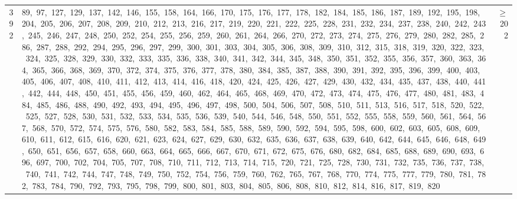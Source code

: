 \begin{longtable}{c|p{}|r}
392 & 89,\ 97,\ 127,\ 129,\ 137,\ 142,\ 146,\ 155,\ 158,\ 164,\ 166,\ 170,\ 175,\ 176,\ 177,\ 178,\ 182,\ 184,\ 185,\ 186,\ 187,\ 189,\ 192,\ 195,\ 198,\ 204,\ 205,\ 206,\ 207,\ 208,\ 209,\ 210,\ 212,\ 213,\ 216,\ 217,\ 219,\ 220,\ 221,\ 222,\ 225,\ 228,\ 231,\ 232,\ 234,\ 237,\ 238,\ 240,\ 242,\ 243,\ 245,\ 246,\ 247,\ 248,\ 250,\ 252,\ 254,\ 255,\ 256,\ 259,\ 260,\ 261,\ 264,\ 266,\ 270,\ 272,\ 273,\ 274,\ 275,\ 276,\ 279,\ 280,\ 282,\ 285,\ 286,\ 287,\ 288,\ 292,\ 294,\ 295,\ 296,\ 297,\ 299,\ 300,\ 301,\ 303,\ 304,\ 305,\ 306,\ 308,\ 309,\ 310,\ 312,\ 315,\ 318,\ 319,\ 320,\ 322,\ 323,\ 324,\ 325,\ 328,\ 329,\ 330,\ 332,\ 333,\ 335,\ 336,\ 338,\ 340,\ 341,\ 342,\ 344,\ 345,\ 348,\ 350,\ 351,\ 352,\ 355,\ 356,\ 357,\ 360,\ 363,\ 364,\ 365,\ 366,\ 368,\ 369,\ 370,\ 372,\ 374,\ 375,\ 376,\ 377,\ 378,\ 380,\ 384,\ 385,\ 387,\ 388,\ 390,\ 391,\ 392,\ 395,\ 396,\ 399,\ 400,\ 403,\ 405,\ 406,\ 407,\ 408,\ 410,\ 411,\ 412,\ 413,\ 414,\ 416,\ 418,\ 420,\ 424,\ 425,\ 426,\ 427,\ 429,\ 430,\ 432,\ 434,\ 435,\ 437,\ 438,\ 440,\ 441,\ 442,\ 444,\ 448,\ 450,\ 451,\ 455,\ 456,\ 459,\ 460,\ 462,\ 464,\ 465,\ 468,\ 469,\ 470,\ 472,\ 473,\ 474,\ 475,\ 476,\ 477,\ 480,\ 481,\ 483,\ 484,\ 485,\ 486,\ 488,\ 490,\ 492,\ 493,\ 494,\ 495,\ 496,\ 497,\ 498,\ 500,\ 504,\ 506,\ 507,\ 508,\ 510,\ 511,\ 513,\ 516,\ 517,\ 518,\ 520,\ 522,\ 525,\ 527,\ 528,\ 530,\ 531,\ 532,\ 533,\ 534,\ 535,\ 536,\ 539,\ 540,\ 544,\ 546,\ 548,\ 550,\ 551,\ 552,\ 555,\ 558,\ 559,\ 560,\ 561,\ 564,\ 567,\ 568,\ 570,\ 572,\ 574,\ 575,\ 576,\ 580,\ 582,\ 583,\ 584,\ 585,\ 588,\ 589,\ 590,\ 592,\ 594,\ 595,\ 598,\ 600,\ 602,\ 603,\ 605,\ 608,\ 609,\ 610,\ 611,\ 612,\ 615,\ 616,\ 620,\ 621,\ 623,\ 624,\ 627,\ 629,\ 630,\ 632,\ 635,\ 636,\ 637,\ 638,\ 639,\ 640,\ 642,\ 644,\ 645,\ 646,\ 648,\ 649,\ 650,\ 651,\ 656,\ 657,\ 658,\ 660,\ 663,\ 664,\ 665,\ 666,\ 667,\ 670,\ 671,\ 672,\ 675,\ 676,\ 680,\ 682,\ 684,\ 685,\ 688,\ 689,\ 690,\ 693,\ 696,\ 697,\ 700,\ 702,\ 704,\ 705,\ 707,\ 708,\ 710,\ 711,\ 712,\ 713,\ 714,\ 715,\ 720,\ 721,\ 725,\ 728,\ 730,\ 731,\ 732,\ 735,\ 736,\ 737,\ 738,\ 740,\ 741,\ 742,\ 744,\ 747,\ 748,\ 749,\ 750,\ 752,\ 754,\ 756,\ 759,\ 760,\ 762,\ 765,\ 767,\ 768,\ 770,\ 774,\ 775,\ 777,\ 779,\ 780,\ 781,\ 782,\ 783,\ 784,\ 790,\ 792,\ 793,\ 795,\ 798,\ 799,\ 800,\ 801,\ 803,\ 804,\ 805,\ 806,\ 808,\ 810,\ 812,\ 814,\ 816,\ 817,\ 819,\ 820 & $\ge$ 202 \\

\end{longtable}
